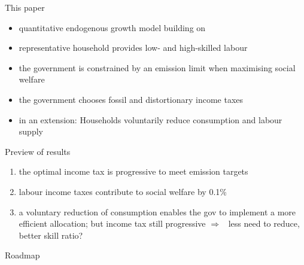 \documentclass[11pt,aspectratio=169]{beamer}
\newcommand{\ar}{$\Rightarrow$ \ }
\begin{document}
\begin{frame}{This paper}
\begin{itemize}
	\item<+-> quantitative endogenous growth model building on \cite{Fried2018ClimateAnalysis}
	\vspace{3mm}
	\item<+-> representative household provides low- and high-skilled labour 
    \vspace{3mm}
	\item<+-> the government is constrained by an emission limit when maximising social welfare 	
	\vspace{3mm}
	\item<+-> the government chooses fossil and distortionary income taxes
	\vspace{3mm}
\item<+-> in an extension: Households voluntarily reduce consumption and labour supply
\end{itemize}
\end{frame}


\begin{frame}{Preview of results}
\begin{enumerate}
	\item<+-> the optimal income tax is progressive  to meet emission targets
		\vspace{3mm}
	\item<+-> labour income taxes contribute to social welfare by 0.1\% %
	
	\vspace{3mm}
	\item<+-> a voluntary reduction of consumption enables the gov to implement a more efficient allocation; but income tax still progressive \ar less need to reduce, better skill ratio?
\end{enumerate}
\end{frame}
\begin{frame}{Roadmap}
	\tableofcontents
\end{frame}
\end{document}
